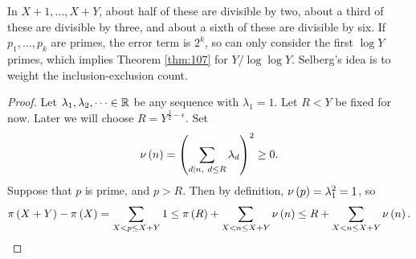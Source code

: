 In $ X + 1, \dots, X + Y $, about half of these are divisible by two, about a third of these are divisible by three, and about a sixth of these are divisible by six. If $ p_1, \dots, p_k $ are primes, the error term is $ 2^k $, so can only consider the first $ \log Y $ primes, which implies Theorem \ref{thm:107} for $ Y / \log \log Y $. Selberg's idea is to weight the inclusion-exclusion count.

\begin{proof}
Let $ \lambda_1, \lambda_2, \dots \in \mathbb{R} $ be any sequence with $ \lambda_1 = 1 $. Let $ R < Y $ be fixed for now. Later we will choose $ R = Y^{\tfrac{1}{2} - \epsilon} $. Set
$$ \nu\br{n} = \br{\sum_{d \mid n, \ d \le R} \lambda_d}^2 \ge 0. $$
Suppose that $ p $ is prime, and $ p > R $. Then by definition, $ \nu\br{p} = \lambda_1^2 = 1 $, so
$$ \pi\br{X + Y} - \pi\br{X} = \sum_{X < p \le X + Y} 1 \le \pi\br{R} + \sum_{X < n \le X + Y} \nu\br{n} \le R + \sum_{X < n \le X + Y} \nu\br{n}. $$

\pagebreak


\end{proof}
